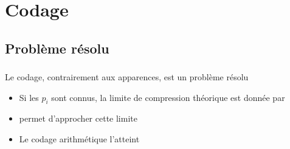\documentclass{beamer}
\newcommand{\relief}[1]{{\color{structureTextColor} #1}}
\theoremstyle{theoreme}
\begin{document}
\section{Codage}
\subsection{Problème résolu}

\begin{frame}
  \frametitle{\secname{}}
  \framesubtitle{\subsecname{}}
  Le codage, contrairement aux apparences, est un problème \relief{résolu}
  \begin{itemize}
    \item Si les $p_i$ sont connus, la limite de compression théorique est donnée par 
    \item {} permet d'approcher cette limite
    \item Le codage arithmétique l'atteint
  \end{itemize}
\end{frame}
\end{document}
